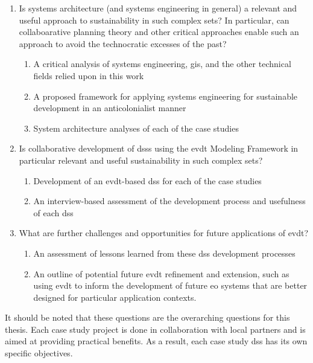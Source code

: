 \documentclass[notitlepage]{article}
\begin{document}
\begin{enumerate}[itemsep=0pt,parsep=0pt]
	\item{Is systems architecture (and systems engineering in general) a relevant and useful approach to sustainability in such complex \ac{sets}? In particular, can collaboarative planning theory and other critical approaches enable such an approach to avoid the technocratic excesses of the past?}
	\begin{enumerate}[label=\emph{\alph*}),itemsep=0pt,parsep=0pt]
		\item{A critical analysis of systems engineering, \ac{gis}, and the other technical fields relied upon in this work}
		\item{A proposed framework for applying systems engineering for sustainable development in an anticolonialist manner}
		\item{System architecture analyses of each of the case studies}
	\end{enumerate}
	\item{Is collaborative development of \acp{dss} using the  \ac{evdt} Modeling Framework in particular relevant and useful sustainability in such complex \ac{sets}?}
	\begin{enumerate}[label=\emph{\alph*}),itemsep=0pt,parsep=0pt]
		\item{Development of an \ac{evdt}-based \ac{dss} for each of the case studies}
		\item{An interview-based assessment of the development process and usefulness of each \ac{dss}}
	\end{enumerate}
	\item{What are further challenges and opportunities for future applications of \ac{evdt}?}
	\begin{enumerate}[label=\emph{\alph*}),itemsep=0pt,parsep=0pt]
		\item{An assessment of lessons learned from these \ac{dss} development processes}
		\item{An outline of potential future \ac{evdt} refinement and extension, such as using \ac{evdt} to inform the development of future \ac{eo} systems that are better designed for particular application contexts.}
	\end{enumerate}
\end{enumerate}

It should be noted that these questions are the overarching questions for this thesis. Each case study project is done in collaboration with local partners and is aimed at providing practical benefits. As a result, each case study \ac{dss} has its own specific objectives.
\end{document}
